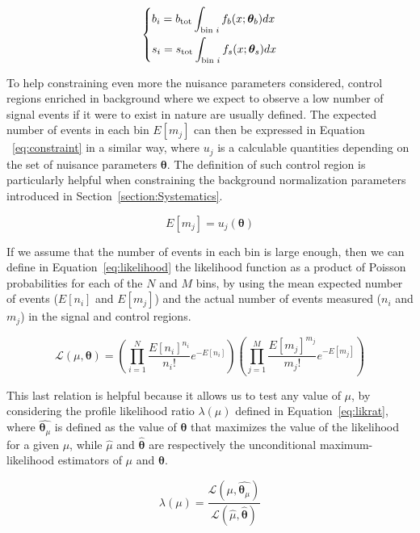 \documentclass[a4paper, 10pt, openright]{report}
\begin{document}
\begin{equation}
\label{eq:events}
\begin{dcases}
b_i = b_{\text{tot}} \int_{\text{bin }i} f_b(x;\bm \theta_b)dx \\
s_i = s_{\text{tot}} \int_{\text{bin }i} f_s(x;\bm \theta_s)dx
\end{dcases}
\end{equation}

To help constraining even more the nuisance parameters considered, control regions enriched in background where we expect to observe a low number of signal events if it were to exist in nature are usually defined. The expected number of events in each bin $E[m_j]$ can then be expressed in Equation ~\ref{eq:constraint} in a similar way, where $u_j$ is a calculable quantities depending on the set of nuisance parameters $\bm \theta$. The definition of such control region is particularly helpful when constraining the background normalization parameters introduced in Section~\ref{section:Systematics}.

\begin{equation}
\label{eq:constraint}
E[m_j] = u_j(\bm \theta)
\end{equation}

If we assume that the number of events in each bin is large enough, then we can define in Equation~\ref{eq:likelihood} the likelihood function as a product of Poisson probabilities for each of the $N$ and $M$ bins, by using the mean expected number of events ($E[n_i]$ and $E[m_j]$) and the actual number of events measured ($n_i$ and $m_j$) in the signal and control regions.

\begin{equation}
\label{eq:likelihood}
\mathcal{L}(\mu, \bm \theta) = \left (\prod_{i = 1}^N \frac{E[n_i]^{n_i}}{n_i!} e^{-E[n_i]} \right) \left (\prod_{j=1}^M \frac{E[m_j]^{m_j}}{m_j!} e^{-E[m_j]} \right)
\end{equation}

This last relation is helpful because it allows us to test any value of $\mu$, by considering the profile likelihood ratio $\lambda(\mu)$ defined in Equation~\ref{eq:likrat}, where $\hat{\bm \theta_\mu}$ is defined as the value of $\bm \theta$ that maximizes the value of the likelihood for a given $\mu$, while $\hat{\mu}$ and $\hat{\bm \theta}$ are respectively the unconditional maximum-likelihood estimators of $\mu$ and $\bm \theta$.

\begin{equation}
\label{eq:likrat}
\lambda(\mu) = \frac{\mathcal{L}(\mu, \hat{\bm \theta_\mu})}{\mathcal{L}(\hat{\mu}, \hat{\bm \theta})} 
\end{equation}
\end{document}
